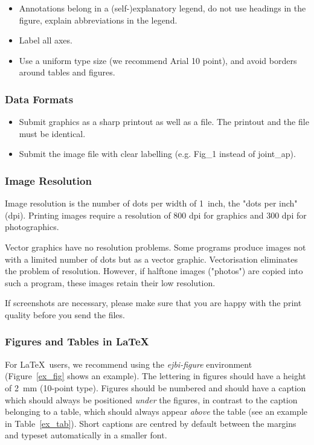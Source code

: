 \documentclass[a4paper,10pt,twocolumn,twoside,openright]{article}
\begin{document}
\begin{itemize}
\item Annotations belong in a (self-)explanatory legend, do not use headings in the figure, explain abbreviations in the legend.
\item Label all axes.
\item Use a uniform type size (we recommend Arial 10 point), and avoid borders around tables and figures.
\end{itemize}

\subsubsection*{Data Formats}

\begin{itemize}
\item Submit graphics as a sharp printout as well as a file. The printout and the file must be identical.
\item Submit the image file with clear labelling (e.g. Fig\_1 instead of joint\_ap).
\end{itemize}

\subsubsection*{Image Resolution}

Image resolution is the number of dots per width of 1~inch, the "dots per inch" (dpi). Printing images require a resolution of 800 dpi for graphics and 300 dpi for photographics.

Vector graphics have no resolution problems. Some programs produce images not with a limited number of dots but as a vector graphic. Vectorisation eliminates the problem of resolution. However, if halftone images ("photos") are copied into such a program, these images retain their low resolution.

If screenshots are necessary, please make sure that you are happy with the print quality before you send the files.

\subsubsection*{Figures and Tables in \LaTeX}

For \LaTeX\ users, we recommend using the \emph{ejbi-figure} environment (Figure~\ref{ex_fig} shows an example).  The lettering in figures should have a height of 2~mm (10-point type). Figures should be numbered and should have a caption which should always be positioned \emph{under} the figures, in contrast to the caption belonging to a table, which should always appear \emph{above} the table (see an example in Table~\ref{ex_tab}). Short captions are centred by default between the margins and typeset automatically in a smaller font. 
\end{document}
